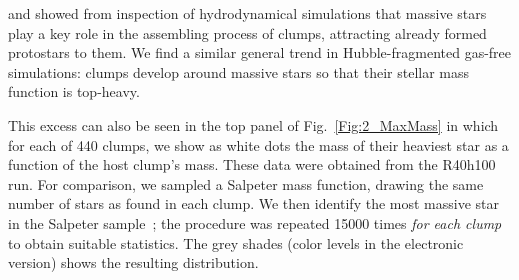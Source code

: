 \cite{Bonnell2004} and \cite{Maschberger2010} showed from inspection of  hydrodynamical simulations that massive stars play a key role in the assembling process of clumps, attracting already formed protostars to them. We find  a similar general trend in Hubble-fragmented gas-free simulations: clumps develop around massive stars so that their stellar mass function is top-heavy. 

This excess can also be seen in the top panel of Fig.~\ref{Fig:2_MaxMass} in which for each of 440 clumps, we show as white dots the mass of their heaviest star as a function of the host clump's mass. These data were obtained from the R40h100 run. For comparison, we sampled a Salpeter mass function, drawing the same number of stars as found in each clump. We then identify the most massive star in the Salpeter sample~; the procedure was repeated 15000 times {\it for each clump} to obtain suitable statistics. The grey shades (color levels in the electronic version)  shows the resulting distribution.



